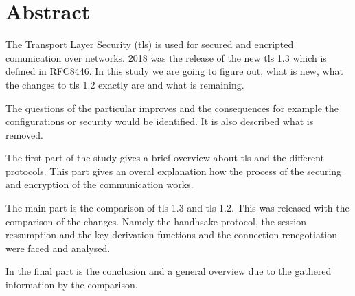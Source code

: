 \chapter*{Abstract}
\label{chap:abstract}
The Transport Layer Security (\gls{tls}) is used for secured and encripted comunication over networks. 2018 was the release of the new \gls{tls} 1.3 which is defined in RFC8446. In this study we are going to figure out, what is new, what the changes to \gls{tls} 1.2 exactly are and what is remaining. 

The questions of the particular improves and the consequences for example the configurations or security would be identified. It is also described what is removed. 

The first part of the study gives a brief overview about \gls{tls} and the different protocols. This part gives an overal explanation how the process of the securing and encryption of the communication works. 

The main part is the comparison of \gls{tls} 1.3 and \gls{tls} 1.2. This was released with the comparison of the changes. Namely the handhsake protocol, the session ressumption and the key derivation functions and the connection renegotiation were faced and analysed.

In the final part is the conclusion and a general overview due to the gathered information by the comparison.



